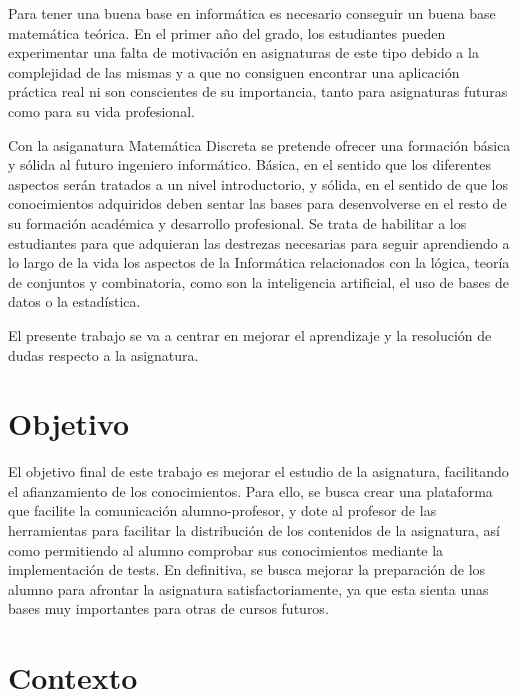 \documentclass[openright,twoside,10pt]{book}
\begin{document}
    Para tener una buena base en informática es necesario conseguir un buena
    base matemática teórica. En el primer año del grado, los estudiantes
    pueden experimentar una falta de motivación en asignaturas de este tipo
    debido a la complejidad de las mismas y a que no consiguen encontrar una
    aplicación práctica real ni son conscientes de su importancia, tanto
    para asignaturas futuras como para su vida profesional.
    
    Con la asiganatura Matemática Discreta se pretende ofrecer una formación
    básica y sólida al futuro ingeniero informático. Básica, en el sentido
    que los diferentes aspectos serán tratados a un nivel introductorio, y
    sólida, en el sentido de que los conocimientos adquiridos deben sentar
    las bases para desenvolverse en el resto de su formación académica y
    desarrollo profesional. Se trata de habilitar a los estudiantes para que
    adquieran las destrezas necesarias para seguir aprendiendo a lo largo de
    la vida los aspectos de la Informática relacionados con la lógica,
    teoría de conjuntos y combinatoria, como son la inteligencia artificial,
    el uso de bases de datos o la estadística.
    
    El presente trabajo se va a centrar en mejorar el aprendizaje y la
    resolución de dudas respecto a la asignatura.
    
    \section{Objetivo}\label{objetivo}
    
    El objetivo final de este trabajo es mejorar el estudio de la
    asignatura, facilitando el afianzamiento de los conocimientos. Para
    ello, se busca crear una plataforma que facilite la comunicación
    alumno-profesor, y dote al profesor de las herramientas para facilitar
    la distribución de los contenidos de la asignatura, así como permitiendo
    al alumno comprobar sus conocimientos mediante la implementación de
    tests. En definitiva, se busca mejorar la preparación de los alumno para
    afrontar la asignatura satisfactoriamente, ya que esta sienta unas bases
    muy importantes para otras de cursos futuros.
    
    \section{\texorpdfstring{Contexto
    \cite{guiamatematicadiscreta}}{Contexto }}\label{contexto}
    
\end{document}
